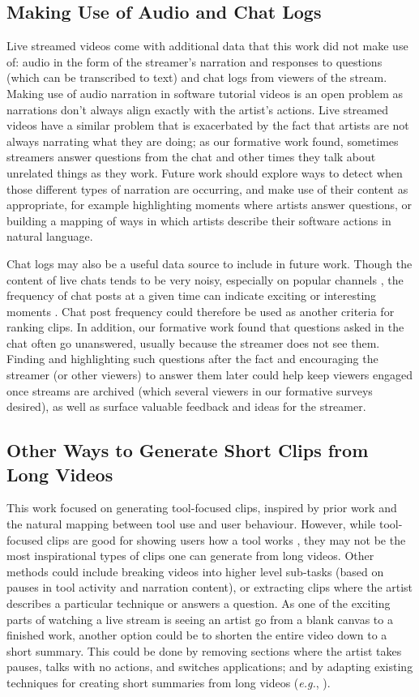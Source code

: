 \subsection{Making Use of Audio and Chat Logs}
Live streamed videos come with additional data that this work did not make use of: audio in the form of the streamer's narration and responses to questions (which can be transcribed to text) and chat logs from viewers of the stream. Making use of audio narration in software tutorial videos is an open problem \cite{Chi2012} as narrations don't always align exactly with the artist's actions. Live streamed videos have a similar problem that is exacerbated by the fact that artists are not always narrating what they are doing; as our formative work found, sometimes streamers answer questions from the chat and other times they talk about unrelated things as they work. Future work should explore ways to detect when those different types of narration are occurring, and make use of their content as appropriate, for example highlighting moments where artists answer questions, or building a mapping of ways in which artists describe their software actions in natural language.

Chat logs may also be a useful data source to include in future work. Though the content of live chats tends to be very noisy, especially on popular channels \cite{Hamilton2014}, the frequency of chat posts at a given time can indicate exciting or interesting moments \cite{Pan2016}. Chat post frequency could therefore be used as another criteria for ranking clips. In addition, our formative work found that questions asked in the chat often go unanswered, usually because the streamer does not see them. Finding and highlighting such questions after the fact and encouraging the streamer (or other viewers) to answer them later could help keep viewers engaged once streams are archived (which several viewers in our formative surveys desired), as well as surface valuable feedback and ideas for the streamer.

\subsection{Other Ways to Generate Short Clips from Long Videos}
This work focused on generating tool-focused clips, inspired by prior work \cite{Grossman2010a, Lafreniere2014} and the natural mapping between tool use and user behaviour. However, while tool-focused clips are good for showing users how a tool works \cite{Grossman2010a}, they may not be the most inspirational types of clips one can generate from long videos. Other methods could include breaking videos into higher level sub-tasks (based on pauses in tool activity and narration content), or extracting clips where the artist describes a particular technique or answers a question. As one of the exciting parts of watching a live stream is seeing an artist go from a blank canvas to a finished work, another option could be to shorten the entire video down to a short summary. This could be done by removing sections where the artist takes pauses, talks with no actions, and switches applications; and by adapting existing techniques for creating short summaries from long videos (\textit{e.g.}, \cite{Truong2007}). 

